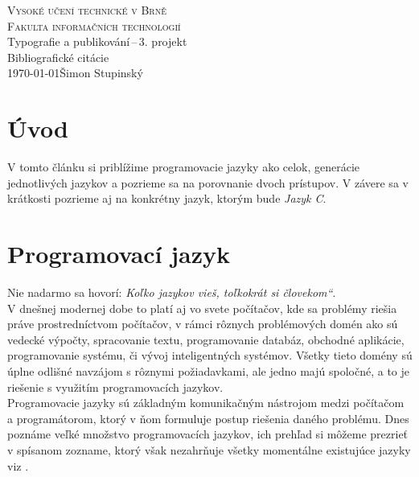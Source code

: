 \documentclass[11pt,a4paper,titlepage]{article}
\providecommand{\myuv}[1]{\quotedblbase #1\textquotedblleft}
\begin{document}
\begin{titlepage}
\begin{center}
\textsc{\Huge {Vysoké učení technické v Brně} \\ \medskip \huge {Fakulta informačních technologií}}\\
{ \LARGE Typografie a publikování\,--\,3. projekt \\   \Huge {Bibliografické citácie}}\\
{\Large \today \hfill Šimon Stupinský}
\end{center}
\end{titlepage}


\section{Úvod} 
V tomto článku si priblížime programovacie jazyky ako celok, generácie jednotlivých jazykov a pozrieme sa na porovnanie dvoch prístupov. V závere sa v krátkosti pozrieme aj na konkrétny jazyk, ktorým bude \textit{Jazyk C}.

\section{Programovací jazyk} 
Nie nadarmo sa hovorí: \textit{\myuv{Koľko jazykov vieš, toľkokrát si človekom}}. \cite{quotation:web} \\
V dnešnej modernej dobe to platí aj vo svete počítačov, kde sa problémy riešia práve prostredníctvom počítačov, v rámci rôznych problémových domén ako sú vedecké výpočty, spracovanie textu, programovanie databáz, obchodné aplikácie, programovanie systému, či vývoj inteligentných systémov. Všetky tieto domény sú úplne odlišné navzájom s rôznymi požiadavkami, ale jedno majú spoločné, a to je riešenie s využitím programovacích jazykov. \cite{Introduction:Book} \\
Programovacie jazyky sú základným komunikačným nástrojom medzi počítačom a programátorom, ktorý v ňom formuluje postup riešenia daného problému. Dnes poznáme veľké množstvo programovacích jazykov, ich prehľad si môžeme prezrieť v spísanom zozname, ktorý však nezahrňuje všetky momentálne existujúce jazyky viz \cite{List:Wiki}.
\end{document}
